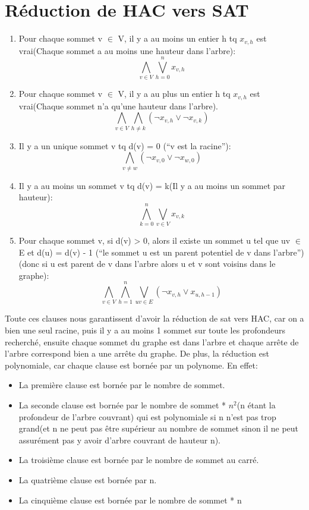 \documentclass[10pt, a4paper]{article}
\begin{document}
\section {Réduction de HAC vers SAT}
\begin {enumerate}
\item Pour chaque sommet v $\in$ V, il y a au moins un entier h tq $x_{v,h}$ est vrai(Chaque sommet a au moins une hauteur dans l'arbre):
  \[
  \bigwedge_{v \in V}\bigvee_{h=0}^nx_{v,h}
  \]
\item  Pour chaque sommet v $\in$ V, il y a au plus un entier h tq $x_{v,h}$ est vrai(Chaque sommet n'a qu'une hauteur dans l'arbre).
  \[
  \bigwedge_{v\in V}\bigwedge_{h\neq k}(\neg x_{v,h} \vee \neg x_{v,k})
  \]
\item Il y a un unique sommet v tq d(v) = 0 (``v est la racine''):
  \[
  \bigwedge_{v\neq w}(\neg x_{v,0} \vee \neg x_{w,0})
  \]
\item Il y a au moins un sommet v tq d(v) = k(Il y a au moins un sommet par hauteur):
  \[
  \bigwedge_{k=0}^{n}\bigvee_{v\in V}x_{v,k}
  \]
\item Pour chaque sommet v, si d(v) > 0, alors il existe un sommet u tel que uv $\in$ E et d(u) = d(v) - 1 (``le sommet u est un parent potentiel de v dans l'arbre'')(donc si u est parent de v dans l'arbre alors u et v sont voisins dans le graphe):
  \[
  \bigwedge_{v\in V}\bigwedge_{h=1}^n\bigvee_{uv\in E}(\neg x_{v,h}\vee x_{u,h-1})
  \]
\end {enumerate}
\newpage
Toute ces clauses nous garantissent d'avoir la réduction de sat vers HAC, car on a bien une seul racine, puis il y a au moins 1 sommet sur toute les profondeurs
recherché, ensuite chaque sommet du graphe est dans l'arbre et chaque arrête de l'arbre correspond bien a une arrête du graphe.\newline
De plus, la réduction est polynomiale, car chaque clause est bornée par un polynome.\newline
En effet:
\begin {itemize}
\item La première clause est bornée par le nombre de sommet.
\item La seconde clause est bornée par le nombre de sommet * $n^2$(n étant la profondeur de l'arbre couvrant) qui est polynomiale si n n'est pas trop grand(et n ne peut pas être supérieur au nombre de sommet sinon il ne peut assurément pas y avoir d'arbre couvrant de hauteur n).
\item La troisième clause est bornée par le nombre de sommet au carré.
\item La quatrième clause est bornée par n.
\item La cinquième clause est bornée par le nombre de sommet * n
\end {itemize}
\end{document}
